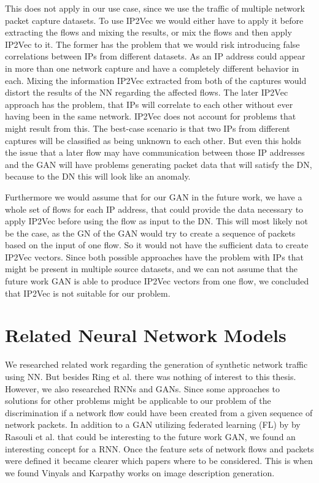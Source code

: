 \documentclass[
	ngerman,
	ruledheaders=section,%
	class=report,%
	thesis={type=bachelor},%
	accentcolor=9c,%
	custommargins=true,%
	marginpar=false,%
	parskip=half-,%
	fontsize=11pt,%
	twoside
]{tudapub}
\begin{document}
This does not apply in our use case, since we use the traffic of multiple network packet capture datasets.
To use IP2Vec we would either have to apply it before extracting the flows and mixing the results,
or mix the flows and then apply IP2Vec to it.
The former has the problem that we would risk introducing false correlations between IPs from different datasets.
As an IP address could appear in more than one network capture and have a completely different behavior in each.
Mixing the information IP2Vec extracted from both of the captures would distort the results of the NN regarding the affected flows.
The later IP2Vec approach has the problem, that IPs will correlate to each other without ever having been in the same network.
IP2Vec does not account for problems that might result from this.
The best-case scenario is that two IPs from different captures will be classified as being unknown to each other.
But even this holds the issue that a later flow may have communication between those IP addresses and the GAN will have problems generating packet data that will satisfy the DN, because to the DN this will look like an anomaly.

Furthermore we would assume that for our GAN in the future work, we have a whole set of flows for each IP address, that could provide the data necessary to apply IP2Vec before using the flow as input to the DN.
This will most likely not be the case, as the GN of the GAN would try to create a sequence of packets based on the input of one flow.
So it would not have the sufficient data to create IP2Vec vectors.
Since both possible approaches have the problem with IPs that might be present in multiple source datasets,
and we can not assume that the future work GAN is able to produce IP2Vec vectors from one flow,
we concluded that IP2Vec is not suitable for our problem.

\section{Related Neural Network Models}
\label{sec:relatedNNmodels}

We researched related work regarding the generation of synthetic network traffic using NN.
But besides Ring et al. there was nothing of interest to this thesis.
However, we also researched RNNs and GANs.
Since some approaches to solutions for other problems might be applicable to our problem of
the discrimination if a network flow could have been created from a given sequence of network packets.
In addition to a GAN utilizing federated learning (FL) by by Rasouli et al. \cite{rasouliFedGANFederatedGenerative2020} that could be interesting to the future work GAN, we found an interesting concept for a RNN.
Once the feature sets of network flows and packets were defined it became clearer which papers where to be considered.
This is when we found Vinyals \cite{vinyalsShowTellNeural2015} and Karpathy \cite{karpathyDeepVisualSemanticAlignments2015} works on image description generation.
\end{document}
